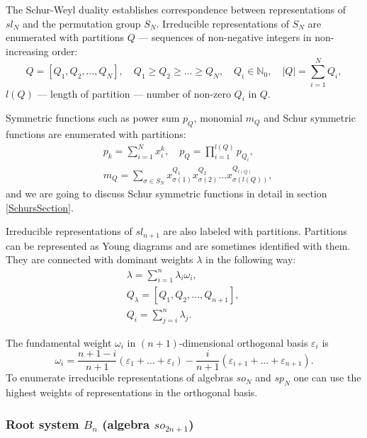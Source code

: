 \documentclass{article}
\def\ep{\varepsilon}
\begin{document}
The Schur-Weyl duality establishes correspondence between representations of $sl_N$ and the permutation group $S_N$.
Irreducible representations of $S_N$ are enumerated with partitions $Q$ --- sequences of non-negative integers in non-increasing order:
\begin{equation}
Q = [Q_1, Q_2, \dots, Q_N], \quad Q_1\geq Q_2\geq \dots\geq Q_N, \quad Q_i \in \mathbb{N}_0,\quad |Q| = \sum_{i=1}^{N}Q_i,
\end{equation}
$l(Q)$ --- length of partition --- number of non-zero $Q_i$ in $Q$.

Symmetric functions such as power sum $p_{Q}$, monomial $m_Q$ and Schur symmetric functions are enumerated with partitions:
\begin{align}
   & p_k = \sum_{i=1}^{N} x_i^{k}, \quad p_{Q} = \prod_{i=1}^{l(Q)} p_{Q_i}, \label{psum} \\
   & m_{Q} = \sum_{\sigma\in S_N} x_{\sigma(1)}^{Q_1}x_{\sigma(2)}^{Q_2} \dots x_{\sigma(l(Q))}^{Q_{l(Q)}}, \label{monom}
\end{align}
and we are going to discuss Schur symmetric functions in detail in section \ref{SchursSection}.

Irreducible representations of $sl_{n+1}$ are also labeled with partitions. Partitions can be represented as Young diagrams and are sometimes identified with them. They are connected with dominant weights $\lambda$ in the following way:
\begin{equation}
    \begin{aligned}
      &  \lambda = \sum_{i=1}^{n} \lambda_i \omega_i , \\
      &  Q_{\lambda} = [Q_1, Q_2, \dots, Q_{n+1}], \quad \\
      &  Q_i = \sum_{j=i}^{n} \lambda_j.
    \end{aligned}
    \label{weigthA}
\end{equation}

The fundamental weight $\omega_i$ in $(n+1)$-dimensional orthogonal basis $\ep_i$ is
\begin{equation}
    \omega_i = \frac{n+1-i}{n+1} (\ep_1+\dots+\ep_i)-\frac{i}{n+1}(\ep_{i+1}+\dots+\ep_{n+1}).
\end{equation}
\noindent
To enumerate irreducible representations of algebras $so_N$ and $sp_N$ one can use the highest weights of representations in the orthogonal basis.

\subsubsection{Root system $B_n$ (algebra $so_{2n+1}$)}
\end{document}
